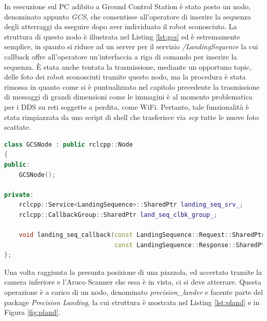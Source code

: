 \indent In esecuzione sul PC adibito a Ground Control Station è stato posto un nodo, denominato appunto \emph{GCS}, che consentisse all'operatore di inserire la sequenza degli atterraggi da eseguire dopo aver individuato il robot sconosciuto. La struttura di questo nodo è illustrata nel Listing \ref{lst:gcs} ed è estremamente semplice, in quanto si riduce ad un server per il servizio \emph{/LandingSequence} la cui callback offre all'operatore un'interfaccia a riga di comando per inserire la sequenza. È stata anche tentata la trasmissione, mediante un opportuno topic, delle foto dei robot sconosciuti tramite questo nodo, ma la procedura è stata rimossa in quanto come si è puntualizzato nel capitolo precedente la trasmissione di messaggi di grandi dimensioni come le immagini è al momento problematica per i DDS su reti soggette a perdita, come WiFi. Pertanto, tale funzionalità è stata rimpiazzata da uno script di shell che trasferisce via \emph{scp} tutte le nuove foto scattate.
\vspace{1cm}
\begin{lstlisting}[language=C++, caption={Definizione del nodo \emph{gcs}.}, label={lst:gcs}]
class GCSNode : public rclcpp::Node
{
public:
    GCSNode();

private:
    rclcpp::Service<LandingSequence>::SharedPtr landing_seq_srv_;
    rclcpp::CallbackGroup::SharedPtr land_seq_clbk_group_;

    void landing_seq_callback(const LandingSequence::Request::SharedPtr request,
                              const LandingSequence::Response::SharedPtr response);
};
\end{lstlisting}

\indent Una volta raggiunta la presunta posizione di una piazzola, ed accertato tramite la camera inferiore e l'Aruco Scanner che essa è in vista, ci si deve atterrare. Questa operazione è a carico di un nodo, denominato \emph{precision\_lander} e facente parte del package \emph{Precision Landing}, la cui struttura è mostrata nel Listing \ref{lst:pland} e in Figura \ref{fig:pland}.

